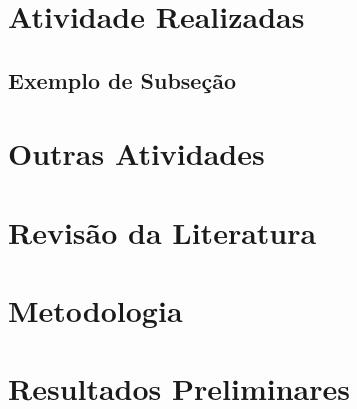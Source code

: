 \documentclass[12pt, a4paper]{article}
\begin{document}
\section{Atividade Realizadas}




\subsection{Exemplo de Subseção}
\cite{narasiman2011improving}
\section{Outras Atividades}
\section{Revisão da Literatura}
\section{Metodologia}
\section{Resultados Preliminares}
\newpage


{}
\end{document}

